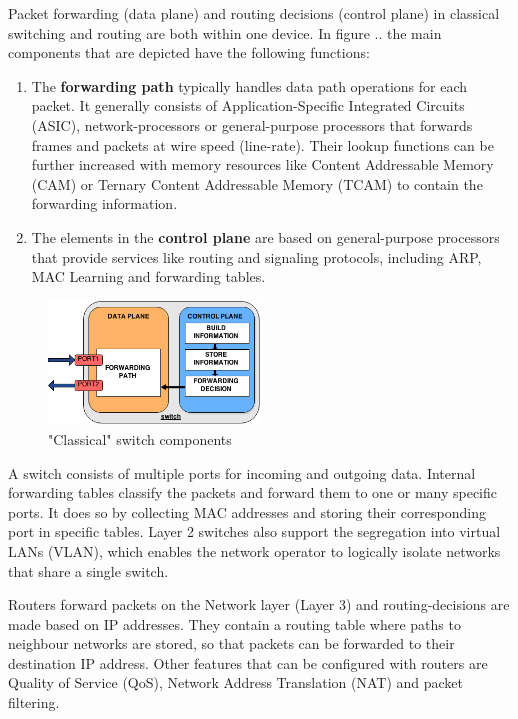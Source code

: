Packet forwarding (data plane) and routing decisions (control plane) in classical switching and routing are both within one device. In figure .. the main components that are depicted have the following functions:
\begin{enumerate}
\item The \textbf{forwarding path} typically handles data path operations for each packet. It generally consists of Application-Specific Integrated Circuits (ASIC), network-processors or general-purpose processors that forwards frames and packets at wire speed (line-rate). Their lookup functions can be further increased with memory resources like Content Addressable Memory (CAM) or Ternary Content Addressable Memory (TCAM) to contain the forwarding information.
\item The elements in the \textbf{control plane} are based on general-purpose processors that provide services like routing and signaling protocols, including ARP, MAC Learning and forwarding tables.
\end{enumerate}

\begin{figure}[H]
\centering

\includegraphics[width=0.5\textwidth]{images/fundamentals/switch_components}

\caption{"Classical" switch components}
\end{figure}

A switch consists of multiple ports for incoming and outgoing data. Internal forwarding tables classify the packets and forward them to one or many specific ports. It does so by collecting MAC addresses and storing their corresponding port in specific tables. Layer 2 switches also support the segregation into virtual LANs (VLAN), which enables the network operator to logically isolate networks that share a single switch.

Routers forward packets on the Network layer (Layer 3) and routing-decisions are made based on IP addresses. They contain a routing table where paths to neighbour networks are stored, so that packets can be forwarded to their destination IP address. Other features that can be configured with routers are Quality of Service (QoS), Network Address Translation (NAT) and packet filtering.

